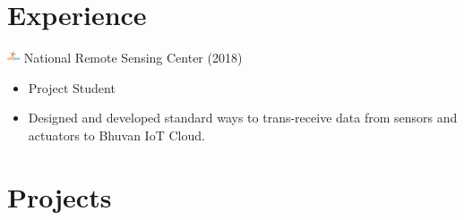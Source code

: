 \documentclass{article}
\begin{document}
\section*{Experience}
\includegraphics[width=14px]{isro.png} National Remote Sensing Center (2018)
\begin{itemize}
\item \small Project Student
\item \small Designed and developed standard ways to trans-receive data from sensors and actuators to  Bhuvan IoT Cloud.
\end{itemize}

\section*{Projects}
\end{document}

